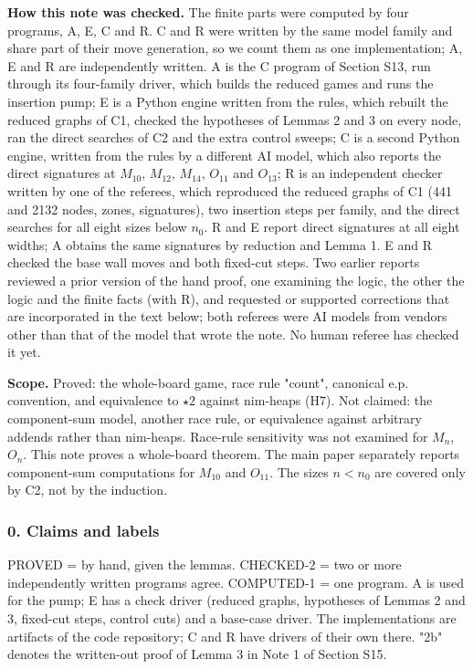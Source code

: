 \textbf{How this note was checked.} The finite parts were computed by four programs, A, E, C and R. C and R were written by the same model family and share part of their move generation, so we count them as one implementation; A, E and R are independently written. A is the C program of Section S13, run through its four-family driver, which builds the reduced games and runs the insertion pump; E is a Python engine written from the rules, which rebuilt the reduced graphs of C1, checked the hypotheses of Lemmas 2 and 3 on every node, ran the direct searches of C2 and the extra control sweeps; C is a second Python engine, written from the rules by a different AI model, which also reports the direct signatures at $M_{10}$, $M_{12}$, $M_{14}$, $O_{11}$ and $O_{13}$; R is an independent checker written by one of the referees, which reproduced the reduced graphs of C1 (441 and 2132 nodes, zones, signatures), two insertion steps per family, and the direct searches for all eight sizes below $n_0$. R and E report direct signatures at all eight widths; A obtains the same signatures by reduction and Lemma 1. E and R checked the base wall moves and both fixed-cut steps. Two earlier reports reviewed a prior version of the hand proof, one examining the logic, the other the logic and the finite facts (with R), and requested or supported corrections that are incorporated in the text below; both referees were AI models from vendors other than that of the model that wrote the note. No human referee has checked it yet.

\textbf{Scope.} Proved: the whole-board game, race rule "count", canonical e.p. convention, and equivalence to $\star2$ against nim-heaps (H7). Not claimed: the component-sum model, another race rule, or equivalence against arbitrary addends rather than nim-heaps. Race-rule sensitivity was not examined for $M_n$, $O_n$. This note proves a whole-board theorem. The main paper separately reports component-sum computations for $M_{10}$ and $O_{11}$. The sizes $n<n_0$ are covered only by C2, not by the induction.

\subsubsection*{0. Claims and labels}
PROVED = by hand, given the lemmas. CHECKED-2 = two or more independently written programs agree. COMPUTED-1 = one program. A is used for the pump; E has a check driver (reduced graphs, hypotheses of Lemmas 2 and 3, fixed-cut steps, control cuts) and a base-case driver. The implementations are artifacts of the code repository; C and R have drivers of their own there. "2b" denotes the written-out proof of Lemma 3 in Note 1 of Section S15.

